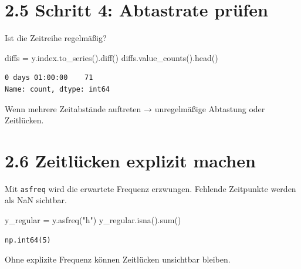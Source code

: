 \documentclass[
  ngerman,
  letterpaper,
  DIV=11]{scrreprt}
\newenvironment{Shaded}{\begin{snugshade}}{\end{snugshade}}
\newcommand{\BuiltInTok}[1]{\textcolor[rgb]{0.00,0.23,0.31}{#1}}
\newcommand{\NormalTok}[1]{\textcolor[rgb]{0.00,0.23,0.31}{#1}}
\newcommand{\OperatorTok}[1]{\textcolor[rgb]{0.37,0.37,0.37}{#1}}
\newcommand{\StringTok}[1]{\textcolor[rgb]{0.13,0.47,0.30}{#1}}
\begin{document}
\section{2.5 Schritt 4: Abtastrate
prüfen}\label{schritt-4-abtastrate-pruxfcfen}

Ist die Zeitreihe regelmäßig?

\begin{Shaded}
\begin{Highlighting}[]
\NormalTok{diffs }\OperatorTok{=}\NormalTok{ y.index.to\_series().diff()}
\NormalTok{diffs.value\_counts().head()}
\end{Highlighting}
\end{Shaded}

\begin{verbatim}
0 days 01:00:00    71
Name: count, dtype: int64
\end{verbatim}

Wenn mehrere Zeitabstände auftreten → unregelmäßige Abtastung oder
Zeitlücken.

\section{2.6 Zeitlücken explizit
machen}\label{zeitluxfccken-explizit-machen}

Mit \texttt{asfreq} wird die erwartete Frequenz erzwungen. Fehlende
Zeitpunkte werden als NaN sichtbar.

\begin{Shaded}
\begin{Highlighting}[]
\NormalTok{y\_regular }\OperatorTok{=}\NormalTok{ y.asfreq(}\StringTok{"h"}\NormalTok{)}
\NormalTok{y\_regular.isna().}\BuiltInTok{sum}\NormalTok{()}
\end{Highlighting}
\end{Shaded}

\begin{verbatim}
np.int64(5)
\end{verbatim}

\begin{tcolorbox}[enhanced jigsaw, titlerule=0mm, title=\textcolor{quarto-callout-warning-color}{\faExclamationTriangle}\hspace{0.5em}{Achtung}, bottomrule=.15mm, opacityback=0, colbacktitle=quarto-callout-warning-color!10!white, coltitle=black, opacitybacktitle=0.6, colframe=quarto-callout-warning-color-frame, toprule=.15mm, leftrule=.75mm, arc=.35mm, rightrule=.15mm, breakable, bottomtitle=1mm, colback=white, toptitle=1mm, left=2mm]

Ohne explizite Frequenz können Zeitlücken unsichtbar bleiben.

\end{tcolorbox}
\end{document}
